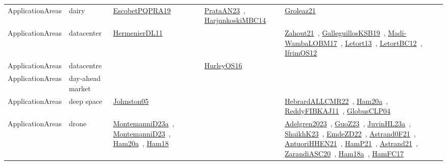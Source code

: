 {\begin{longtable}{lp{3cm}>{\raggedright\arraybackslash}p{6cm}>{\raggedright\arraybackslash}p{6cm}>{\raggedright\arraybackslash}p{8cm}}
ApplicationAreas & dairy & \href{../works/EscobetPQPRA19.pdf}{EscobetPQPRA19}~\cite{EscobetPQPRA19} & \href{../works/PrataAN23.pdf}{PrataAN23}~\cite{PrataAN23}, \href{../works/HarjunkoskiMBC14.pdf}{HarjunkoskiMBC14}~\cite{HarjunkoskiMBC14} & \href{../works/Groleaz21.pdf}{Groleaz21}~\cite{Groleaz21}\\
ApplicationAreas & datacenter & \href{../works/HermenierDL11.pdf}{HermenierDL11}~\cite{HermenierDL11} &  & \href{../works/Zahout21.pdf}{Zahout21}~\cite{Zahout21}, \href{../works/GalleguillosKSB19.pdf}{GalleguillosKSB19}~\cite{GalleguillosKSB19}, \href{../works/Madi-WambaLOBM17.pdf}{Madi-WambaLOBM17}~\cite{Madi-WambaLOBM17}, \href{../works/Letort13.pdf}{Letort13}~\cite{Letort13}, \href{../works/LetortBC12.pdf}{LetortBC12}~\cite{LetortBC12}, \href{../works/IfrimOS12.pdf}{IfrimOS12}~\cite{IfrimOS12}\\
ApplicationAreas & datacentre &  & \href{../works/HurleyOS16.pdf}{HurleyOS16}~\cite{HurleyOS16} & \\
ApplicationAreas & day-ahead market &  &  & \\
ApplicationAreas & deep space & \href{../works/Johnston05.pdf}{Johnston05}~\cite{Johnston05} &  & \href{../works/HebrardALLCMR22.pdf}{HebrardALLCMR22}~\cite{HebrardALLCMR22}, \href{../works/Ham20a.pdf}{Ham20a}~\cite{Ham20a}, \href{../works/ReddyFIBKAJ11.pdf}{ReddyFIBKAJ11}~\cite{ReddyFIBKAJ11}, \href{../works/GlobusCLP04.pdf}{GlobusCLP04}~\cite{GlobusCLP04}\\
ApplicationAreas & drone & \href{../works/MontemanniD23a.pdf}{MontemanniD23a}~\cite{MontemanniD23a}, \href{../works/MontemanniD23.pdf}{MontemanniD23}~\cite{MontemanniD23}, \href{../works/Ham20a.pdf}{Ham20a}~\cite{Ham20a}, \href{../works/Ham18.pdf}{Ham18}~\cite{Ham18} &  & \href{../works/Adelgren2023.pdf}{Adelgren2023}~\cite{Adelgren2023}, \href{../works/GuoZ23.pdf}{GuoZ23}~\cite{GuoZ23}, \href{../works/JuvinHL23a.pdf}{JuvinHL23a}~\cite{JuvinHL23a}, \href{../works/ShaikhK23.pdf}{ShaikhK23}~\cite{ShaikhK23}, \href{../works/EmdeZD22.pdf}{EmdeZD22}~\cite{EmdeZD22}, \href{../works/Astrand0F21.pdf}{Astrand0F21}~\cite{Astrand0F21}, \href{../works/AntuoriHHEN21.pdf}{AntuoriHHEN21}~\cite{AntuoriHHEN21}, \href{../works/HamP21.pdf}{HamP21}~\cite{HamP21}, \href{../works/Astrand21.pdf}{Astrand21}~\cite{Astrand21}, \href{../works/ZarandiASC20.pdf}{ZarandiASC20}~\cite{ZarandiASC20}, \href{../works/Ham18a.pdf}{Ham18a}~\cite{Ham18a}, \href{../works/HamFC17.pdf}{HamFC17}~\cite{HamFC17}\\

\end{longtable}}
